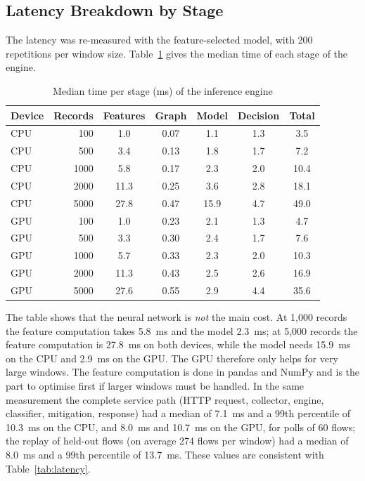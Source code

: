 \subsection{Latency Breakdown by Stage}
The latency was re-measured with the feature-selected model, with 200 repetitions per window size. Table~\ref{tab:latstage} gives the median time of each stage of the engine.

\begin{table}[htbp]
\centering
\caption{Median time per stage (ms) of the inference engine}
\label{tab:latstage}
\small
\begin{tabular}{|l|r|c|c|c|c|c|}
\hline
\textbf{Device} & \textbf{Records} & \textbf{Features} & \textbf{Graph} & \textbf{Model} & \textbf{Decision} & \textbf{Total} \\ \hline
CPU & 100 & 1.0 & 0.07 & 1.1 & 1.3 & 3.5 \\ \hline
CPU & 500 & 3.4 & 0.13 & 1.8 & 1.7 & 7.2 \\ \hline
CPU & 1000 & 5.8 & 0.17 & 2.3 & 2.0 & 10.4 \\ \hline
CPU & 2000 & 11.3 & 0.25 & 3.6 & 2.8 & 18.1 \\ \hline
CPU & 5000 & 27.8 & 0.47 & 15.9 & 4.7 & 49.0 \\ \hline
GPU & 100 & 1.0 & 0.23 & 2.1 & 1.3 & 4.7 \\ \hline
GPU & 500 & 3.3 & 0.30 & 2.4 & 1.7 & 7.6 \\ \hline
GPU & 1000 & 5.7 & 0.33 & 2.3 & 2.0 & 10.3 \\ \hline
GPU & 2000 & 11.3 & 0.43 & 2.5 & 2.6 & 16.9 \\ \hline
GPU & 5000 & 27.6 & 0.55 & 2.9 & 4.4 & 35.6 \\ \hline
\end{tabular}
\end{table}

The table shows that the neural network is \emph{not} the main cost. At 1,000 records the feature computation takes 5.8~ms and the model 2.3~ms; at 5,000 records the feature computation is 27.8~ms on both devices, while the model needs 15.9~ms on the CPU and 2.9~ms on the GPU. The GPU therefore only helps for very large windows. The feature computation is done in pandas and NumPy and is the part to optimise first if larger windows must be handled. In the same measurement the complete service path (HTTP request, collector, engine, classifier, mitigation, response) had a median of 7.1~ms and a 99th percentile of 10.3~ms on the CPU, and 8.0~ms and 10.7~ms on the GPU, for polls of 60 flows; the replay of held-out flows (on average 274 flows per window) had a median of 8.0~ms and a 99th percentile of 13.7~ms. These values are consistent with Table~\ref{tab:latency}.

